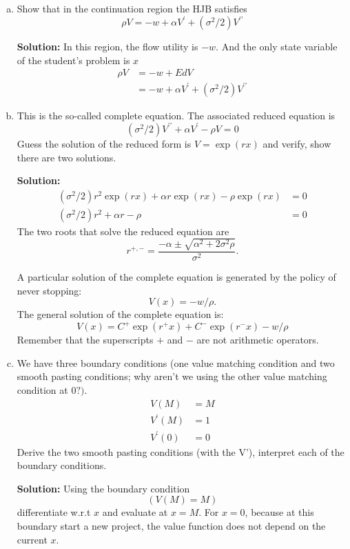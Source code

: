 \documentclass[11pt]{extarticle}
\theoremstyle{plain}
\theoremstyle{definition}
\begin{document}
\begin{enumerate}[(a)]
\item Show that in the continuation region the HJB satisfies $$\rho V = -w+\alpha V^{\prime}+\left(\sigma^2 / 2\right) V^{\prime \prime}$$

\textbf{Solution:}
In this region, the flow utility is $-w$. And the only state variable of the student's problem is $x$
$$
\begin{aligned}
\rho V &=-w+E d V \\
&=-w+\alpha V^{\prime}+\left(\sigma^2 / 2\right) V^{\prime \prime}
\end{aligned}
$$


\item This is the so-called complete equation. The associated reduced equation is
$$
\left(\sigma^2 / 2\right) V^{\prime \prime}+\alpha V^{\prime}-\rho V=0
$$
Guess the solution of the reduced form is $V=\exp (r x)$ and verify, show there are two solutions.

\textbf{Solution:}
  $$
\begin{aligned}
\left(\sigma^2 / 2\right) r^2 \exp (r x)+\alpha r \exp (r x)-\rho \exp (r x) &=0 \\
\left(\sigma^2 / 2\right) r^2+\alpha r-\rho &=0
\end{aligned}
$$
The two roots that solve the reduced equation are
$$
r^{+,-}=\frac{-\alpha \pm \sqrt{\alpha^2+2 \sigma^2 \rho}}{\sigma^2} .
$$

A particular solution of the complete equation is generated by the policy of never stopping:
$$
V(x)=-w / \rho .
$$
The general solution of the complete equation is:
$$
V(x)=C^{+} \exp \left(r^{+} x\right)+C^{-} \exp \left(r^{-} x\right)-w / \rho
$$
Remember that the superscripts $+$ and $-$ are not arithmetic operators.

\item We have three boundary conditions (one value matching condition and two smooth pasting conditions; why aren't we using the other value matching condition at $0 ?)$.
$$
\begin{aligned}
V(M) &=M \\
V^{\prime}(M) &=1 \\
V^{\prime}(0) &=0
\end{aligned}
$$
Derive the two smooth pasting conditions (with the V'), interpret each of the boundary conditions.

\textbf{Solution:} Using the boundary condition $$(V(M) =M)$$ differentiate w.r.t $x$ and evaluate at $x=M$. For $x=0$, because at this boundary start a new project, the value function does not depend on the current $x$. 


\end{enumerate}
\end{document}
